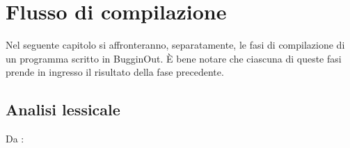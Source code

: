 
\chapter{Flusso di compilazione}
\label{chap:flusso-di-compilazione}

Nel seguente capitolo si affronteranno, separatamente, le fasi di compilazione di un programma scritto in BugginOut. \`E bene notare che ciascuna di queste fasi prende in ingresso il risultato della fase precedente.

\section{Analisi lessicale}
\label{sec:analisi-lessicale}

Da \cite{alfred2007compilers}:

